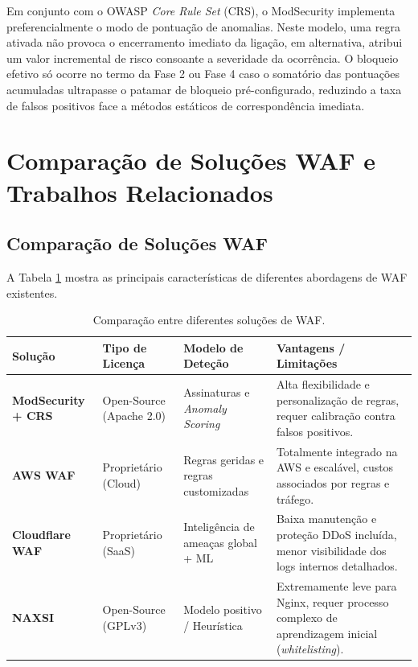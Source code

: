 \documentclass[11pt,a4paper]{article}
\begin{document}
Em conjunto com o OWASP \textit{Core Rule Set} (CRS), o ModSecurity implementa preferencialmente o modo de pontuação de anomalias. Neste modelo, uma regra ativada não provoca o encerramento imediato da ligação, em alternativa, atribui um valor incremental de risco consoante a severidade da ocorrência. O bloqueio efetivo só ocorre no termo da Fase 2 ou Fase 4 caso o somatório das pontuações acumuladas ultrapasse o patamar de bloqueio pré-configurado, reduzindo a taxa de falsos positivos face a métodos estáticos de correspondência imediata.

\clearpage
\section{Comparação de Soluções WAF e Trabalhos Relacionados}
\label{sec:comparativo}

\subsection{Comparação de Soluções WAF}
A Tabela \ref{tab:comparativo_waf} mostra as principais características de diferentes abordagens de WAF existentes.

\begin{table}[h!]
\centering
\caption{Comparação entre diferentes soluções de WAF.}
\label{tab:comparativo_waf}
\begin{tabularx}{\textwidth}{l p{2.5cm} p{3cm} X}
\toprule
\textbf{Solução} & \textbf{Tipo de Licença} & \textbf{Modelo de Deteção} & \textbf{Vantagens / Limitações} \\
\midrule
\textbf{ModSecurity + CRS} & Open-Source (Apache 2.0) & Assinaturas e \textit{Anomaly Scoring} & Alta flexibilidade e personalização de regras, requer calibração contra falsos positivos. \\
\textbf{AWS WAF} & Proprietário (Cloud) & Regras geridas e regras customizadas & Totalmente integrado na AWS e escalável, custos associados por regras e tráfego. \\
\textbf{Cloudflare WAF} & Proprietário (SaaS) & Inteligência de ameaças global + ML & Baixa manutenção e proteção DDoS incluída, menor visibilidade dos logs internos detalhados. \\
\textbf{NAXSI} & Open-Source (GPLv3) & Modelo positivo / Heurística & Extremamente leve para Nginx, requer processo complexo de aprendizagem inicial (\textit{whitelisting}). \\
\bottomrule
\end{tabularx}
\end{table}
\end{document}
